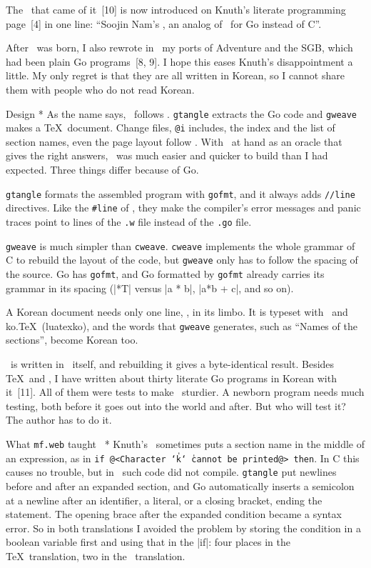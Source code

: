 The \GWEB\ that came of it~[10] is now introduced on Knuth's literate
programming page~[4] in one line: ``Soojin Nam's \GWEB, an analog of
\CWEB\ for Go instead of C''.

After \GWEB\ was born, I also rewrote in \GWEB\ my ports of
Adventure and the SGB, which had been plain Go programs~[8, 9].
I hope this eases Knuth's disappointment a little. My only regret is
that they are all written in Korean, so I cannot share them with people
who do not read Korean.

\subhead * Design *
As the name says, \GWEB\ follows \CWEB. {\tt gtangle} extracts the Go
code and {\tt gweave} makes a \TeX\ document. Change files, {\tt @i}
includes, the index and the list of section names, even the page
layout follow \CWEB. With \CWEB\ at hand as an oracle that gives the
right answers, \GWEB\ was much easier and quicker to build than I had
expected. Three things differ because of Go.

\list\raggedright
\item {\tt gtangle} formats the assembled program with {\tt gofmt},
and it always adds {\tt //line} directives. Like the {\tt \#line} of
\CWEB, they make the compiler's error messages and panic traces point
to lines of the {\tt .w} file instead of the {\tt .go} file.
\item {\tt gweave} is much simpler than {\tt cweave}. {\tt cweave}
implements the whole grammar of C to rebuild the layout of the code,
but {\tt gweave} only has to follow the spacing of the source. Go has
{\tt gofmt}, and Go formatted by {\tt gofmt} already carries its
grammar in its spacing (|*T| versus |a * b|, |a*b + c|, and so on).
\item A Korean document needs only one line, , in
its limbo. It is typeset with \LuaTeX\ and ko.\TeX\ (luatexko), and
the words that {\tt gweave} generates, such as ``Names of the
sections'', become Korean too.
\endlist

\GWEB\ is written in \GWEB\ itself, and rebuilding it gives a
byte-identical result. Besides \TeX\ and \MF, I have written
about thirty literate Go programs in Korean with it~[11]. All of them
were tests to make \GWEB\ sturdier. A newborn program needs much
testing, both before it goes out into the world and after. But who
will test it? The author has to do it.

\subhead * What {\tt mf.web} taught \GWEB\ *
Knuth's \WEB\ sometimes puts a section name in the middle of an
expression, as in {\tt if @<Character \char`\|k\char`\|\ cannot be
printed@> then}. In
C this causes no trouble, but in \GWEB\ such code did not compile.
{\tt gtangle} put newlines before and after an expanded section, and
Go automatically inserts a semicolon at a newline after an identifier,
a literal, or a closing bracket, ending the statement. The opening
brace after the expanded condition became a syntax error. So in both
translations I avoided the problem by storing the condition in a
boolean variable first and using that in the |if|: four places in the
\TeX\ translation, two in the \MF\ translation.

